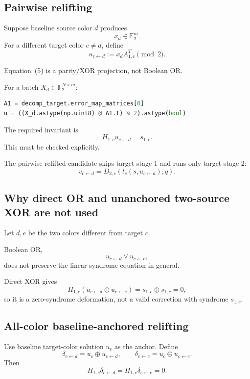 \documentclass[11pt]{article}
\newcommand{\F}{\mathbb{F}_2}
\begin{document}
\subsection{Pairwise relifting}

Suppose baseline source color $d$ produces
\[
    x_d\in\F^m.
\]
For a different target color $c\neq d$, define
\[
    u_{c\leftarrow d}
    :=
    x_dA_{1,c}^{T}\pmod 2.
    \tag{5}
\]

Equation~(5) is a parity/XOR projection, not Boolean OR.

For a batch $X_d\in\F^{N\times m}$:
\begin{lstlisting}[language=Python,basicstyle=\ttfamily\small]
A1 = decomp_target.error_map_matrices[0]
u = ((X_d.astype(np.uint8) @ A1.T) % 2).astype(bool)
\end{lstlisting}

The required invariant is
\[
    H_{1,c}u_{c\leftarrow d}=s_{1,c}.
    \tag{6}
\]
This must be checked explicitly.

The pairwise relifted candidate skips target stage 1 and runs only target stage 2:
\[
    v_{c\leftarrow d}
    =
    D_{2,c}\left(t_c(s,u_{c\leftarrow d});q\right).
    \tag{7}
\]

\subsection{Why direct OR and unanchored two-source XOR are not used}

Let $d,e$ be the two colors different from target $c$.

Boolean OR,
\[
    u_{c\leftarrow d}\lor u_{c\leftarrow e},
\]
does not preserve the linear syndrome equation in general.

Direct XOR gives
\[
    H_{1,c}(u_{c\leftarrow d}\oplus u_{c\leftarrow e})
    =
    s_{1,c}\oplus s_{1,c}
    =
    0,
\]
so it is a zero-syndrome deformation, not a valid correction with syndrome
$s_{1,c}$.

\subsection{All-color baseline-anchored relifting}

Use baseline target-color solution $u_c$ as the anchor. Define
\[
    \delta_{c\leftarrow d}
    =
    u_c\oplus u_{c\leftarrow d},
    \qquad
    \delta_{c\leftarrow e}
    =
    u_c\oplus u_{c\leftarrow e}.
    \tag{8}
\]
Then
\[
    H_{1,c}\delta_{c\leftarrow d}
    =
    H_{1,c}\delta_{c\leftarrow e}
    =
    0.
    \tag{9}
\]
\end{document}
